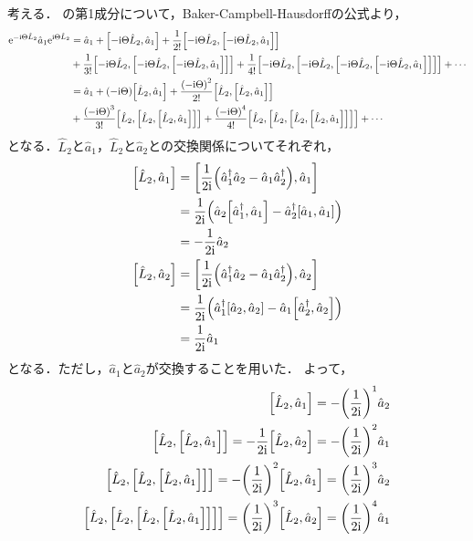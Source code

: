 \documentclass{report}
\begin{document}
    考える．
    の第1成分について，Baker-Campbell-Hausdorffの公式より，
    \begin{align}
      \mathrm{e}^{-\mathrm{i}\Theta\hat{L}_2}\hat{a}_1\mathrm{e}^{\mathrm{i}\Theta\hat{L}_2} &= \hat{a}_1 + \qty[-\mathrm{i}\Theta\hat{L}_2, \hat{a}_1] + \frac{1}{2!}\qty[-\mathrm{i}\Theta\hat{L}_2, \qty[-\mathrm{i}\Theta\hat{L}_2, \hat{a}_1]] \notag\\ 
      &+ \frac{1}{3!}\qty[-\mathrm{i}\Theta\hat{L}_2, \qty[-\mathrm{i}\Theta\hat{L}_2, \qty[-\mathrm{i}\Theta\hat{L}_2, \hat{a}_1]]] + \frac{1}{4!}\qty[-\mathrm{i}\Theta\hat{L}_2, \qty[-\mathrm{i}\Theta\hat{L}_2, \qty[-\mathrm{i}\Theta\hat{L}_2, \qty[-\mathrm{i}\Theta\hat{L}_2, \hat{a}_1]]]] + \cdots \\ 
      &= \hat{a}_1 + \qty(-\mathrm{i}\Theta)\qty[\hat{L}_2, \hat{a}_1] + \frac{\qty(-\mathrm{i}\Theta)^2}{2!}\qty[\hat{L}_2, \qty[\hat{L}_2, \hat{a}_1]]\notag \\ 
      &+ \frac{\qty(-\mathrm{i}\Theta)^3}{3!}\qty[\hat{L}_2, \qty[\hat{L}_2, \qty[\hat{L}_2, \hat{a}_1]]] + \frac{\qty(-\mathrm{i}\Theta)^4}{4!}\qty[\hat{L}_2, \qty[\hat{L}_2, \qty[\hat{L}_2, \qty[\hat{L}_2, \hat{a}_1]]]] + \cdots \label{etl2-a1}
    \end{align}
    となる．$\hat{L}_2$と$\hat{a}_1$，$\hat{L}_2$と$\hat{a}_2$との交換関係についてそれぞれ，
    \begin{align}
      \qty[\hat{L}_2, \hat{a}_1] &= \qty[\frac{1}{2\mathrm{i}}\qty(\hat{a}_1^{\dag}\hat{a}_2 - \hat{a}_1\hat{a}_2^{\dag}), \hat{a}_1] \\ 
      &= \frac{1}{2\mathrm{i}}\qty(\hat{a}_2\qty[\hat{a}_1^{\dag}, \hat{a}_1] - \hat{a}_2^{\dag}\qty[\hat{a}_1, \hat{a}_1]) \\ 
      &= -\frac{1}{2\mathrm{i}}\hat{a}_2 \label{commute-l2a1}\\ 
      \qty[\hat{L}_2, \hat{a}_2] &= \qty[\frac{1}{2\mathrm{i}}\qty(\hat{a}_1^{\dag}\hat{a}_2 - \hat{a}_1\hat{a}_2^{\dag}), \hat{a}_2] \\ 
      &= \frac{1}{2\mathrm{i}}\qty(\hat{a}_1^{\dag}\qty[\hat{a}_2, \hat{a}_2] - \hat{a}_1\qty[\hat{a}_2^{\dag}, \hat{a}_2]) \\ 
      &= \frac{1}{2\mathrm{i}}\hat{a}_1 \label{commute-l2a2}
    \end{align}
    となる．ただし，$\hat{a}_1$と$\hat{a}_2$が交換することを用いた．
    よって，
    \begin{align}
      \qty[\hat{L}_2, \hat{a}_1] = -\qty(\frac{1}{2\mathrm{i}})^1\hat{a}_2 \\ 
      \qty[\hat{L}_2, \qty[\hat{L}_2, \hat{a}_1]] = -\frac{1}{2\mathrm{i}}\qty[\hat{L}_2, \hat{a}_2] = -\qty(\frac{1}{2\mathrm{i}})^2\hat{a}_1 \\ 
      \qty[\hat{L}_2, \qty[\hat{L}_2, \qty[\hat{L}_2, \hat{a}_1]]] = -\qty(\frac{1}{2\mathrm{i}})^2\qty[\hat{L}_2, \hat{a}_1] = \qty(\frac{1}{2\mathrm{i}})^3\hat{a}_2 \\ 
      \qty[\hat{L}_2, \qty[\hat{L}_2, \qty[\hat{L}_2, \qty[\hat{L}_2, \hat{a}_1]]]] = \qty(\frac{1}{2\mathrm{i}})^3\qty[\hat{L}_2, \hat{a}_2] = \qty(\frac{1}{2\mathrm{i}})^4\hat{a}_1 
    \end{align}
\end{document}
